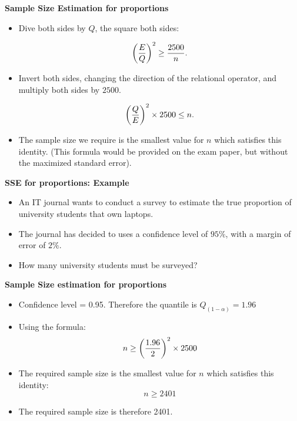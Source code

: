 \documentclass[]{report}
\begin{document}

\textbf{Sample Size Estimation for proportions}

\begin{itemize}

\item Dive both sides by $Q$, the square both sides:

\[ \left({E\over Q}\right)^2 \geq {2500 \over n}. \]

\item Invert both sides, changing the direction of the relational operator, and multiply both sides by $2500$.

\[ \left({Q\over E}\right)^2 \times 2500 \leq n. \]

\item The sample size we require is the smallest value for $n$ which satisfies this identity. (This formula would be provided on the exam paper, but without the maximized standard error).
\end{itemize}


\textbf{SSE for proportions: Example}
\begin{itemize}
\item An IT journal wants to conduct a survey to estimate the true proportion of university students that own laptops.
\item The journal has decided to uses a confidence level of $95\%$, with a margin of error of $2\%$.
\item How many university students must be surveyed?
\end{itemize}



\textbf{Sample Size estimation for proportions}

\begin{itemize}
\item Confidence level = 0.95. Therefore the quantile is $Q_{(1-\alpha)} = 1.96$
\item Using the formula: \[ n \geq \left({1.96 \over 2 }\right)^2 \times 2500  \]
\item The required sample size is the smallest value for $n$ which satisfies this identity: \[ n \geq 2401  \]
\item The required sample size is therefore 2401.
\end{itemize}
\end{document}
